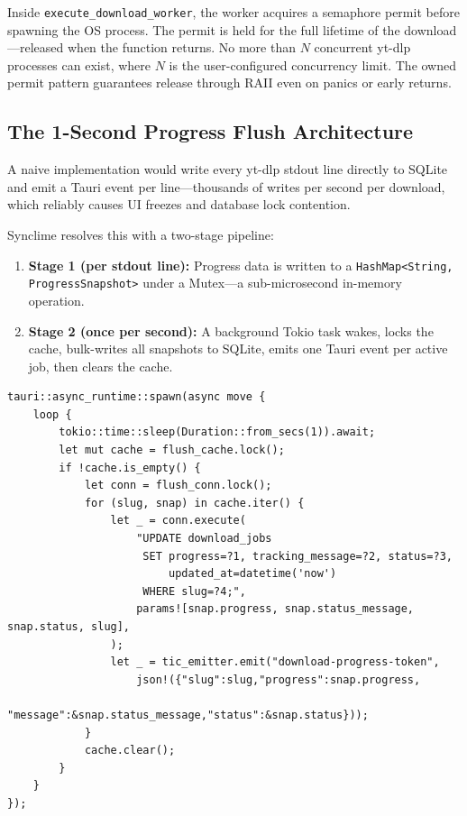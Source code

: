 \documentclass[10pt,letterpaper]{article}
\begin{document}
Inside \texttt{execute\_download\_worker}, the worker acquires a semaphore permit before
spawning the OS process. The permit is held for the full lifetime of the download---released
when the function returns. No more than $N$ concurrent yt-dlp processes can exist, where $N$
is the user-configured concurrency limit. The owned permit pattern guarantees release
through RAII even on panics or early returns.

\subsection{The 1-Second Progress Flush Architecture}

A naive implementation would write every yt-dlp stdout line directly to SQLite and emit a
Tauri event per line---thousands of writes per second per download, which reliably causes
UI freezes and database lock contention.

Synclime resolves this with a two-stage pipeline:

\begin{enumerate}[leftmargin=2em]
  \item \textbf{Stage 1 (per stdout line):} Progress data is written to a
        \texttt{HashMap<String, ProgressSnapshot>} under a Mutex---a sub-microsecond
        in-memory operation.
  \item \textbf{Stage 2 (once per second):} A background Tokio task wakes, locks the
        cache, bulk-writes all snapshots to SQLite, emits one Tauri event per active job,
        then clears the cache.
\end{enumerate}

\begin{lstlisting}[caption={1-second flush worker (lib.rs)}]
tauri::async_runtime::spawn(async move {
    loop {
        tokio::time::sleep(Duration::from_secs(1)).await;
        let mut cache = flush_cache.lock();
        if !cache.is_empty() {
            let conn = flush_conn.lock();
            for (slug, snap) in cache.iter() {
                let _ = conn.execute(
                    "UPDATE download_jobs
                     SET progress=?1, tracking_message=?2, status=?3,
                         updated_at=datetime('now')
                     WHERE slug=?4;",
                    params![snap.progress, snap.status_message, snap.status, slug],
                );
                let _ = tic_emitter.emit("download-progress-token",
                    json!({"slug":slug,"progress":snap.progress,
                           "message":&snap.status_message,"status":&snap.status}));
            }
            cache.clear();
        }
    }
});
\end{lstlisting}
\end{document}
